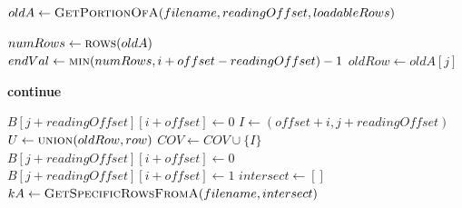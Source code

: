 \documentclass{beamer}
\begin{document}
\begin{frame}{}
    \tiny
    \begin{algorithmic}

                \State $oldA \gets \Call{GetPortionOfA}{filename, readingOffset, loadableRows}$

                \State $numRows \gets \Call{rows}{oldA}$
                \State $endVal \gets \Call{min}{numRows, i + offset - readingOffset} - 1$
                    \State $oldRow \gets oldA[j]$

                        \State \textbf{continue}
                    \EndIf
                    
                        \State $B[j + readingOffset][i + offset] \gets 0$
                    \Else
                        \State $I \gets (offset + i, j + readingOffset)$
                        \State $U \gets \Call{union}{oldRow, row}$
                            \State $COV \gets COV \cup \{I\}$
                            \State $B[j + readingOffset][i + offset] \gets 0$
                        \Else
                            \State $B[j + readingOffset][i + offset] \gets 1$
                            \State $intersect \gets []$ %
                                    \State {}
                                \EndIf
                            \EndFor
                                \State $kA \gets \Call{GetSpecificRowsFromA}{filename, intersect}$
                                \State {}
                            \EndIf
                        \EndIf
                    \EndIf
                \EndFor
            \EndWhile   
        \EndFunction         
    \end{algorithmic}
\end{frame}
\end{document}
